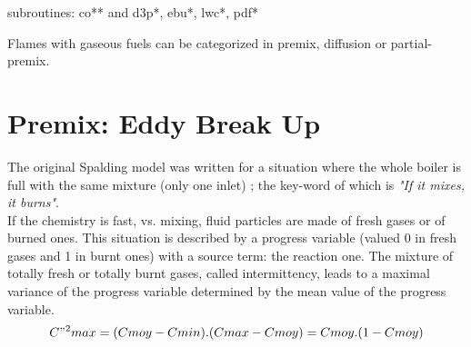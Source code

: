 
%
%
%
%


{\huge subroutines: co** and d3p*, ebu*, lwc*, pdf*}

Flames with gaseous fuels can be categorized in premix, diffusion or
partial-premix.


\section{Premix: Eddy Break Up}

The original Spalding model \cite{1} was written for a situation where
the whole boiler is full with the same mixture ({\small only one
inlet}) ; the key-word of which is {\em"If it mixes, it burns"}.\\

If the chemistry is fast, vs. mixing, fluid particles are made of
fresh gases or of burned ones. This situation is described by a
progress variable ({\small valued 0 in fresh gases and 1 in burnt
ones}) with a source term: the reaction one. The mixture of totally
fresh or totally burnt gases, called intermittency, leads to a maximal
variance of the progress variable determined by the mean value of the
progress variable.\\
\begin{equation}
C"^{2} max = (Cmoy -Cmin).(Cmax-Cmoy) = Cmoy . (1-Cmoy)
\end{equation}


